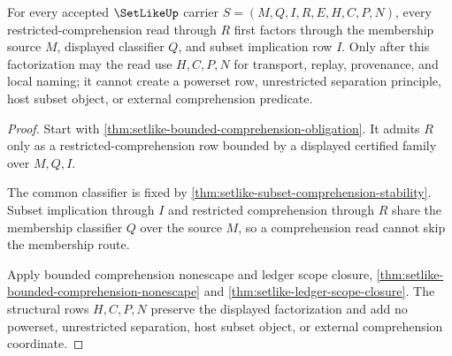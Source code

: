 \begin{theorem}
\label{thm:setlike-restricted-comprehension-membership-factorization}
For every accepted $\SetLikeUp$ carrier $S=(M,Q,I,R,E,H,C,P,N)$, every restricted-comprehension read through $R$ first factors through the membership source $M$, displayed classifier $Q$, and subset implication row $I$. Only after this factorization may the read use $H,C,P,N$ for transport, replay, provenance, and local naming; it cannot create a powerset row, unrestricted separation principle, host subset object, or external comprehension predicate.
\end{theorem}
\begin{proof}
Start with \autoref{thm:setlike-bounded-comprehension-obligation}. It admits $R$ only as a restricted-comprehension row bounded by a displayed certified family over $M,Q,I$.

The common classifier is fixed by \autoref{thm:setlike-subset-comprehension-stability}. Subset implication through $I$ and restricted comprehension through $R$ share the membership classifier $Q$ over the source $M$, so a comprehension read cannot skip the membership route.

Apply bounded comprehension nonescape and ledger scope closure, \autoref{thm:setlike-bounded-comprehension-nonescape} and \autoref{thm:setlike-ledger-scope-closure}. The structural rows $H,C,P,N$ preserve the displayed factorization and add no powerset, unrestricted separation, host subset object, or external comprehension coordinate.
\end{proof}

